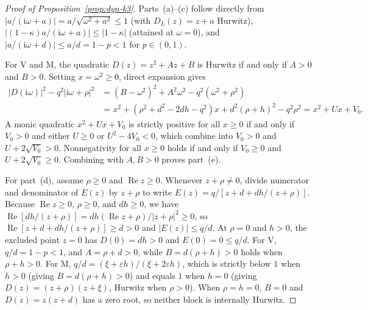 \begin{proof}[Proof of Proposition~{\upshape\ref{prop:dyn-k3}}]
Parts~(a)--(c) follow directly from $|a/(\mathrm{i}\omega + a)| = a/\sqrt{\omega^2 + a^2} \le 1$ (with $D_L(z) = z + a$ Hurwitz), $|(1 - \kappa)a/(\mathrm{i}\omega + a)| \le |1 - \kappa|$ (attained at $\omega = 0$), and $|a/(\mathrm{i}\omega + d)| \le a/d = 1 - p < 1$ for $p \in (0, 1)$.

For V and M, the quadratic $D(z) = z^2 + Az + B$ is Hurwitz if and only if $A > 0$ and $B > 0$. Setting $x = \omega^2 \ge 0$, direct expansion gives
\begin{align*}
|D(\mathrm{i}\omega)|^2 - q^2|\mathrm{i}\omega + \rho|^2
&= (B - \omega^2)^2 + A^2\omega^2 - q^2(\omega^2 + \rho^2) \\
&= x^2 + (\rho^2 + d^2 - 2dh - q^2)x + d^2(\rho + h)^2 - q^2\rho^2 = x^2 + Ux + V_0.
\end{align*}
A monic quadratic $x^2 + Ux + V_0$ is strictly positive for all $x \ge 0$ if and only if $V_0 > 0$ and either $U \ge 0$ or $U^2 - 4V_0 < 0$, which combine into $V_0 > 0$ and $U + 2\sqrt{V_0} > 0$. Nonnegativity for all $x \ge 0$ holds if and only if $V_0 \ge 0$ and $U + 2\sqrt{V_0} \ge 0$. Combining with $A, B > 0$ proves part~(e).

For part~(d), assume $\rho \ge 0$ and $\operatorname{Re} z \ge 0$. Whenever $z + \rho \ne 0$, divide numerator and denominator of $E(z)$ by $z + \rho$ to write $E(z) = q/[z + d + dh/(z + \rho)]$. Because $\operatorname{Re} z \ge 0$, $\rho \ge 0$, and $dh \ge 0$, we have $\operatorname{Re}[dh/(z + \rho)] = dh(\operatorname{Re} z + \rho)/|z + \rho|^2 \ge 0$, so $\operatorname{Re}[z + d + dh/(z + \rho)] \ge d > 0$ and $|E(z)| \le q/d$. At $\rho = 0$ and $h > 0$, the excluded point $z = 0$ has $D(0) = dh > 0$ and $E(0) = 0 \le q/d$. For V, $q/d = 1 - p < 1$, and $A = \rho + d > 0$, while $B = d(\rho + h) > 0$ holds when $\rho + h > 0$. For M, $q/d = (\xi + \varepsilon h)/(\xi + 2\varepsilon h)$, which is strictly below $1$ when $h > 0$ (giving $B = d(\rho + h) > 0$) and equals $1$ when $h = 0$ (giving $D(z) = (z + \rho)(z + \xi)$, Hurwitz when $\rho > 0$). When $\rho = h = 0$, $B = 0$ and $D(z) = z(z + d)$ has a zero root, so neither block is internally Hurwitz.
\end{proof}

